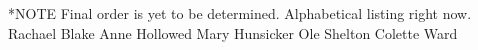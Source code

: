 *NOTE Final order is yet to be determined. Alphabetical listing right now. 
Rachael Blake
Anne Hollowed
Mary Hunsicker 
Ole Shelton
Colette Ward